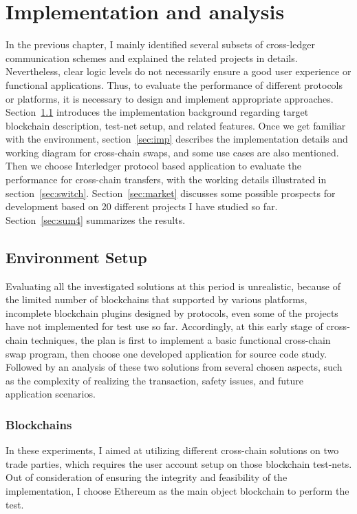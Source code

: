 \chapter{Implementation and analysis} 
\label{chap:4}
\noindent In the previous chapter, I mainly identified several subsets of cross-ledger communication schemes and explained the related projects in details. Nevertheless, clear logic levels do not necessarily ensure a good user experience or functional applications. Thus, to evaluate the performance of different protocols or platforms, it is necessary to design and implement appropriate approaches. \\

\noindent Section~\ref{sec:env} introduces the implementation background regarding target blockchain description, test-net setup, and related features. Once we get familiar with the environment, section~\ref{sec:imp} describes the implementation details and working diagram for cross-chain swaps, and some use cases are also mentioned. Then we choose Interledger protocol based application to evaluate the performance for cross-chain transfers, with the working details illustrated in section~\ref{sec:switch}. Section~\ref{sec:market} discusses some possible prospects for development based on 20 different projects I have studied so far. Section~\ref{sec:sum4} summarizes the results. 

\section{Environment Setup}
\label{sec:env}
\noindent Evaluating all the investigated solutions at this period is unrealistic, because of the limited number of blockchains that supported by various platforms, incomplete blockchain plugins designed by protocols, even some of the projects have not implemented for test use so far. Accordingly, at this early stage of cross-chain techniques, the plan is first to implement a basic functional cross-chain swap program, then choose one developed application for source code study. Followed by an analysis of these two solutions from several chosen aspects, such as the complexity of realizing the transaction, safety issues, and future application scenarios.\\
\subsection{Blockchains}
\noindent In these experiments, I aimed at utilizing different cross-chain solutions on two trade parties, which requires the user account setup on those blockchain test-nets. Out of consideration of ensuring the integrity and feasibility of the implementation, I choose Ethereum as the main object blockchain to perform the test.\\

